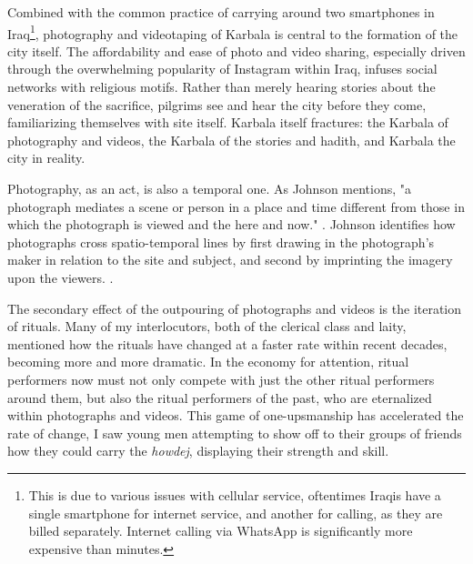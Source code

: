 Combined with the common practice of carrying around two smartphones in Iraq\footnote{This is due to various issues with cellular service, oftentimes Iraqis have a single smartphone for internet service, and another for calling, as they are billed separately. Internet calling via WhatsApp is significantly more expensive than minutes.}, photography and videotaping of Karbala is central to the formation of the city itself. The affordability and ease of photo and video sharing, especially driven through the overwhelming popularity of Instagram within Iraq, infuses social networks with religious motifs. Rather than merely hearing stories about the veneration of the sacrifice, pilgrims see and hear the city before they come, familiarizing themselves with site itself. Karbala itself fractures: the Karbala of photography and videos, the Karbala of the stories and hadith, and Karbala the city in reality.

Photography, as an act, is also a temporal one. As Johnson mentions, "a photograph mediates a scene or person in a place and time different from those in which the photograph is viewed and the here and now." \cite[92]{johnson_automatic_2020}. Johnson identifies how photographs cross spatio-temporal lines by first drawing in the photograph's maker in relation to the site and subject, and second by imprinting the imagery upon the viewers. \cite[92]{johnson_automatic_2020}. 

The secondary effect of the outpouring of photographs and videos is the iteration of rituals. Many of my interlocutors, both of the clerical class and laity, mentioned how the rituals have changed at a faster rate within recent decades, becoming more and more dramatic. In the economy for attention, ritual performers now must not only compete with just the other ritual performers around them, but also the ritual performers of the past, who are eternalized within photographs and videos. This game of one-upsmanship has accelerated the rate of change, I saw young men attempting to show off to their groups of friends how they could carry the \emph{\emph{howdej}}, displaying their strength and skill. 

